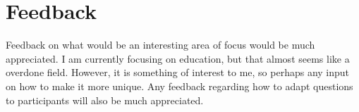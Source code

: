 \chapter{Feedback}\label{C:feedback}

Feedback on what would be an interesting area of focus would be much appreciated. I am currently focusing on education, but that almost seems like a overdone field. However, it is something of interest to me, so perhaps any input on how to make it more unique. Any feedback regarding how to adapt questions to participants will also be much appreciated. 
